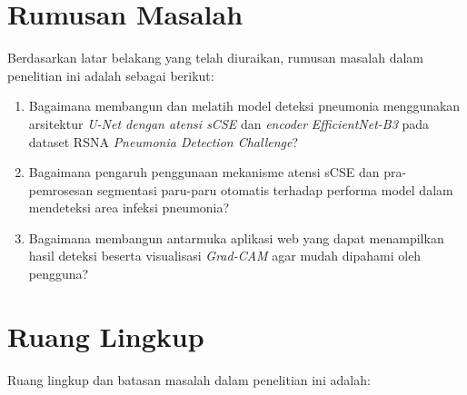 \documentclass[12pt,a4paper,oneside]{book}
\begin{document}
\section{Rumusan Masalah}

Berdasarkan latar belakang yang telah diuraikan, rumusan masalah dalam penelitian ini adalah sebagai berikut:

\begin{enumerate}
  \item Bagaimana membangun dan melatih model deteksi pneumonia menggunakan arsitektur \textit{U-Net dengan atensi sCSE} dan \textit{encoder} \textit{EfficientNet-B3} pada dataset RSNA \textit{Pneumonia Detection Challenge}?
  \item Bagaimana pengaruh penggunaan mekanisme atensi sCSE dan pra-pemrosesan segmentasi paru-paru otomatis terhadap performa model dalam mendeteksi area infeksi pneumonia?
  \item Bagaimana membangun antarmuka aplikasi web yang dapat menampilkan hasil deteksi beserta visualisasi \textit{Grad-CAM} agar mudah dipahami oleh pengguna?
\end{enumerate}

\section{Ruang Lingkup}

Ruang lingkup dan batasan masalah dalam penelitian ini adalah:
\end{document}
